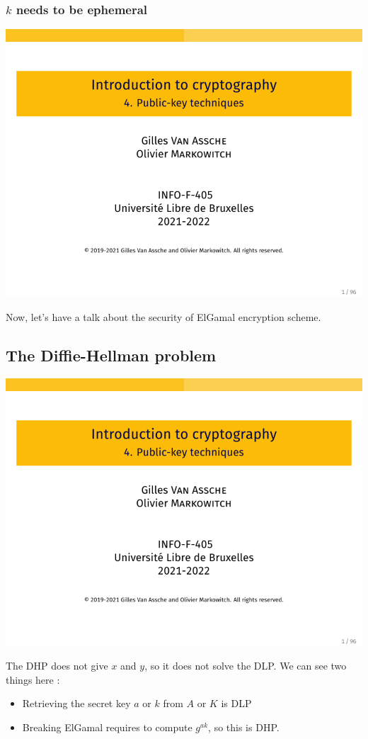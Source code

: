 \documentclass[../Cryptography.tex]{subfiles}
\begin{document}
\subsubsection{$k$ needs to be ephemeral}
\begin{center}
    \includegraphics[width=0.6\linewidth, page=70]{Slides/4-Public.pdf}
\end{center}

Now, let's have a talk about the security of ElGamal encryption scheme.
\subsection{The Diffie-Hellman problem}
\begin{center}
    \includegraphics[width=0.8\linewidth, page=71]{Slides/4-Public.pdf}
\end{center}

The DHP does not give $x$ and $y$, so it does not solve the DLP.
We can see two things here :
\begin{itemize}
    \item Retrieving the secret key $a$ or $k$ from $A$ or $K$ is DLP
    \item Breaking ElGamal requires to compute $g^{ak}$, so this is DHP.
\end{itemize}
\end{document}
